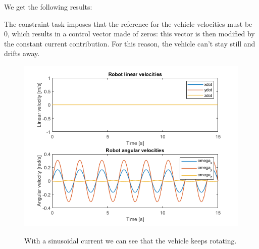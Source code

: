 \documentclass{article}
\begin{document}
We get the following results:
\begin{figure}[H]
	\centering
	\hspace{10mm}
	\label{fig:ex4.1.3ConstantCurrent}
\end{figure}
The constraint task imposes that the reference for the vehicle velocities must be 0, which results in a control vector made of zeros: this vector is then modified by the constant current contribution. For this reason, the vehicle can't stay still and drifts away.
\begin{figure}[H]
	\centering
	\caption{With a sinusoidal current we can see that the vehicle keeps rotating.}
	\includegraphics[scale=0.55]{images/Ex4/Constraint_WithSinusoidalCurrent_LinAngVel}
	\label{fig:ex4.1.3SinusoidalCurrent}
\end{figure}
\end{document}
